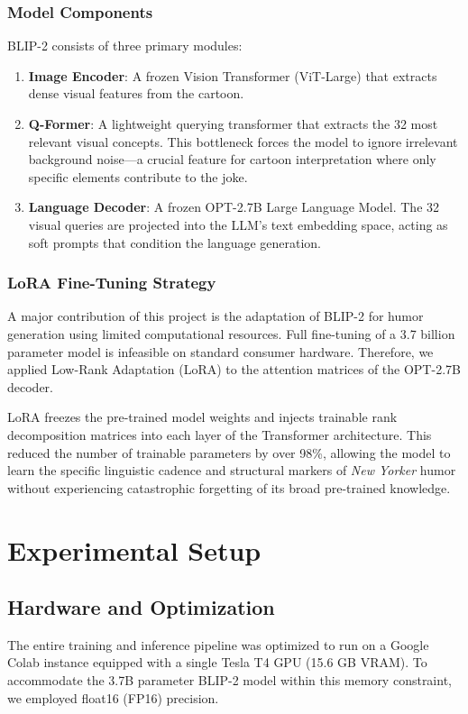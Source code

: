 \documentclass[10pt, conference, compsoc]{IEEEtran}
\begin{document}
\subsubsection{Model Components}
BLIP-2 consists of three primary modules:
\begin{enumerate}
    \item \textbf{Image Encoder}: A frozen Vision Transformer (ViT-Large) that extracts dense visual features from the cartoon.
    \item \textbf{Q-Former}: A lightweight querying transformer that extracts the 32 most relevant visual concepts. This bottleneck forces the model to ignore irrelevant background noise—a crucial feature for cartoon interpretation where only specific elements contribute to the joke.
    \item \textbf{Language Decoder}: A frozen OPT-2.7B Large Language Model. The 32 visual queries are projected into the LLM's text embedding space, acting as soft prompts that condition the language generation.
\end{enumerate}

\subsubsection{LoRA Fine-Tuning Strategy}
A major contribution of this project is the adaptation of BLIP-2 for humor generation using limited computational resources. Full fine-tuning of a 3.7 billion parameter model is infeasible on standard consumer hardware. Therefore, we applied Low-Rank Adaptation (LoRA) to the attention matrices of the OPT-2.7B decoder. 

LoRA freezes the pre-trained model weights and injects trainable rank decomposition matrices into each layer of the Transformer architecture. This reduced the number of trainable parameters by over 98\%, allowing the model to learn the specific linguistic cadence and structural markers of \textit{New Yorker} humor without experiencing catastrophic forgetting of its broad pre-trained knowledge.

\section{Experimental Setup}

\subsection{Hardware and Optimization}
The entire training and inference pipeline was optimized to run on a Google Colab instance equipped with a single Tesla T4 GPU (15.6 GB VRAM). To accommodate the 3.7B parameter BLIP-2 model within this memory constraint, we employed float16 (FP16) precision. 
\end{document}
